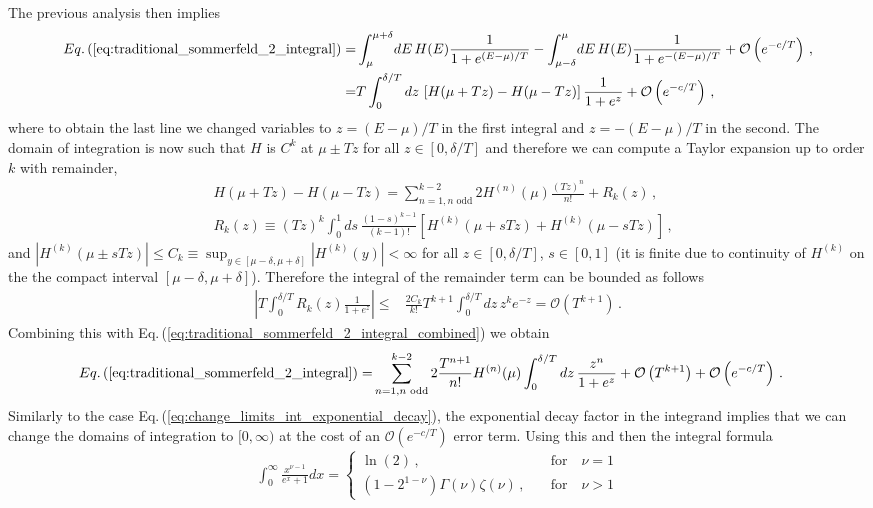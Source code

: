 \documentclass[sn-mathphys,Numbered]{sn-jnl}
\newcommand{\req}[1]{Eq.\,(\ref{#1})}
\begin{document}
The previous analysis then implies 
\begin{align}
 \req{eq:traditional_sommerfeld_2_integral} =&\int_\mu^{\mu+\delta} \!dE\, H(E) \frac{1}{1+e^{(E-\mu)/T}}-\int_{\mu-\delta}^\mu \!dE\,H(E) \frac{1}{1+e^{-(E-\mu)/T}}+\mathcal{O}\left(e^{-c/T}\right)\,,\notag\\
 =&T\int_0^{\delta/T} dz\, \left[H(\mu+Tz) -H(\mu-Tz)\right] \frac{1}{1+e^{z}}+\mathcal{O}\left(e^{-c/T}\right)\,,\label{eq:traditional_sommerfeld_2_integral_combined} 
\end{align}
where to obtain the last line we changed variables to $z=(E-\mu)/T$ in the first integral and $z=-(E-\mu)/T$ in the second. The domain of integration is now such that $H$ is $C^k$ at $\mu\pm Tz$ for all $z\in[0,\delta/T]$ and therefore we can compute a Taylor expansion up to order $k$ with remainder,
\begin{align}
 &H(\mu+Tz)- H(\mu-Tz)=\sum_{n=1,n\text{ odd}}^{k-2} 2H^{(n)}(\mu)\frac{(Tz)^n}{n!}+R_k(z)\,,\\
 &R_k(z)\equiv (Tz)^k \int_0^1 ds\,\frac{(1-s)^{k-1}}{(k-1)!} \left[H^{(k)}(\mu+sTz)+H^{(k)}(\mu-sTz)\right]\,,
\end{align}
and $|H^{(k)}(\mu\pm sTz)|\leq C_k\equiv \sup_{y\in[\mu-\delta,\mu+\delta]}|H^{(k)}(y)|<\infty$ for all $z\in[0,\delta/T]$, $s\in[0,1]$ (it is finite due to continuity of $H^{(k)}$ on the the compact interval $[\mu-\delta,\mu+\delta]$). Therefore the integral of the remainder term can be bounded as follows
\begin{align}
 \left|T\int_0^{\delta/T} R_k(z)\frac{1}{1+e^z}\right|
 \leq&\frac{2C_k}{k!} T^{k+1}\int_0^{\delta/T}dz\, z^k e^{-z}=\mathcal{O}\left(T^{k+1}\right)\,.
\end{align}
Combining this with \req{eq:traditional_sommerfeld_2_integral_combined} we obtain
\begin{align}
 \req{eq:traditional_sommerfeld_2_integral} 
 =&\sum_{n=1,n\text{ odd}}^{k-2} 2\frac{T^{n+1}}{n!} H^{(n)}(\mu)\int_0^{\delta/T} dz\,\frac{z^n}{1+e^{z}}+\mathcal{O}\left(T^{k+1}\right)+\mathcal{O}\left(e^{-c/T}\right)\,.
\end{align}
Similarly to the case \req{eq:change_limits_int_exponential_decay}, the exponential decay factor in the integrand implies that we can change the domains of integration to $[0,\infty)$ at the cost of an $\mathcal{O}(e^{-c/T})$ error term. Using this and then the integral formula
\begin{align}\label{eq:FD_power_integrals}
 \int_0^\infty \frac{x^{\nu-1}}{e^{ x}+1}dx=\begin{cases}
 \ln(2)\,, &\quad\mathrm{for}\quad \nu=1\\
 (1-2^{1-\nu})\Gamma(\nu)\zeta(\nu)\,, &\quad\mathrm{for}\quad \nu > 1
 \end{cases}
\end{align}
\end{document}
